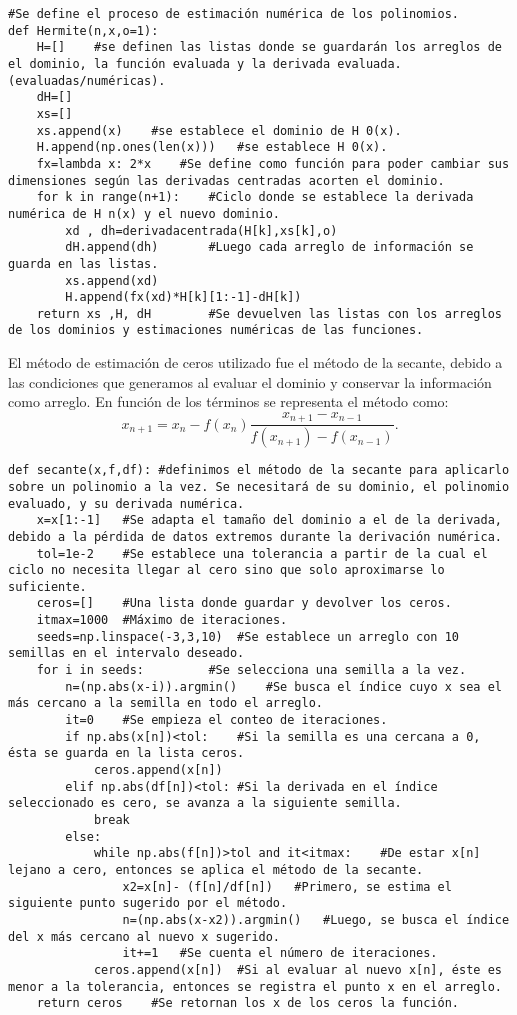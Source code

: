\documentclass[../portafolio.tex]{subfiles}
\begin{document}
\begin{verbatim}
#Se define el proceso de estimación numérica de los polinomios.
def Hermite(n,x,o=1):
    H=[]    #se definen las listas donde se guardarán los arreglos de el dominio, la función evaluada y la derivada evaluada. (evaluadas/numéricas).
    dH=[]
    xs=[]
    xs.append(x)    #se establece el dominio de H 0(x).
    H.append(np.ones(len(x)))   #se establece H 0(x).
    fx=lambda x: 2*x    #Se define como función para poder cambiar sus dimensiones según las derivadas centradas acorten el dominio.
    for k in range(n+1):    #Ciclo donde se establece la derivada numérica de H n(x) y el nuevo dominio.
        xd , dh=derivadacentrada(H[k],xs[k],o)  
        dH.append(dh)       #Luego cada arreglo de información se guarda en las listas.
        xs.append(xd)
        H.append(fx(xd)*H[k][1:-1]-dH[k])
    return xs ,H, dH        #Se devuelven las listas con los arreglos de los dominios y estimaciones numéricas de las funciones.
\end{verbatim}
El método de estimación de ceros utilizado fue el método de la secante, debido a las condiciones que generamos al evaluar el dominio y conservar la información como arreglo. En función de los términos se representa el método como:
\begin{equation}
x_{n+1}=x_n - f(x_n)\frac{x_{n+1}-x_{n-1}}{f(x_{n+1})-f(x_{n-1})}.
\end{equation}
\begin{verbatim}
def secante(x,f,df): #definimos el método de la secante para aplicarlo sobre un polinomio a la vez. Se necesitará de su dominio, el polinomio evaluado, y su derivada numérica.
    x=x[1:-1]   #Se adapta el tamaño del dominio a el de la derivada, debido a la pérdida de datos extremos durante la derivación numérica.
    tol=1e-2    #Se establece una tolerancia a partir de la cual el ciclo no necesita llegar al cero sino que solo aproximarse lo suficiente.
    ceros=[]    #Una lista donde guardar y devolver los ceros.
    itmax=1000  #Máximo de iteraciones.
    seeds=np.linspace(-3,3,10)  #Se establece un arreglo con 10 semillas en el intervalo deseado.
    for i in seeds:         #Se selecciona una semilla a la vez.
        n=(np.abs(x-i)).argmin()    #Se busca el índice cuyo x sea el más cercano a la semilla en todo el arreglo.
        it=0    #Se empieza el conteo de iteraciones.
        if np.abs(x[n])<tol:    #Si la semilla es una cercana a 0, ésta se guarda en la lista ceros.
            ceros.append(x[n])
        elif np.abs(df[n])<tol: #Si la derivada en el índice seleccionado es cero, se avanza a la siguiente semilla.
            break
        else:
            while np.abs(f[n])>tol and it<itmax:    #De estar x[n] lejano a cero, entonces se aplica el método de la secante.
                x2=x[n]- (f[n]/df[n])   #Primero, se estima el siguiente punto sugerido por el método.
                n=(np.abs(x-x2)).argmin()   #Luego, se busca el índice del x más cercano al nuevo x sugerido.
                it+=1   #Se cuenta el número de iteraciones.
            ceros.append(x[n])  #Si al evaluar al nuevo x[n], éste es menor a la tolerancia, entonces se registra el punto x en el arreglo.
    return ceros    #Se retornan los x de los ceros la función.
\end{verbatim}
\end{document}
